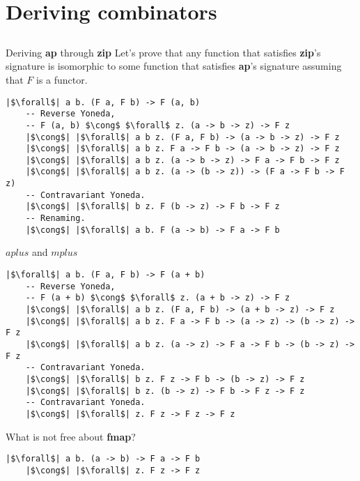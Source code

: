 \documentclass[tikz]{beamer}
\theoremstyle{definition}
\begin{document}
\section{Deriving combinators}
\subsection{}

\begin{frame}[fragile]{Deriving \textbf{ap} through \textbf{zip}}
Let's prove that any function that satisfies \textbf{zip}'s signature is isomorphic
to some function that satisfies \textbf{ap}'s signature assuming that $F$ is a functor.
\begin{verbatim}
|$\forall$| a b. (F a, F b) -> F (a, b)
    -- Reverse Yoneda,
    -- F (a, b) $\cong$ $\forall$ z. (a -> b -> z) -> F z
    |$\cong$| |$\forall$| a b z. (F a, F b) -> (a -> b -> z) -> F z
    |$\cong$| |$\forall$| a b z. F a -> F b -> (a -> b -> z) -> F z
    |$\cong$| |$\forall$| a b z. (a -> b -> z) -> F a -> F b -> F z
    |$\cong$| |$\forall$| a b z. (a -> (b -> z)) -> (F a -> F b -> F z)
    -- Contravariant Yoneda.
    |$\cong$| |$\forall$| b z. F (b -> z) -> F b -> F z
    -- Renaming.
    |$\cong$| |$\forall$| a b. F (a -> b) -> F a -> F b
\end{verbatim}
\end{frame}

\begin{frame}[fragile]{$aplus$ and $mplus$}
\begin{verbatim}
|$\forall$| a b. (F a, F b) -> F (a + b)
    -- Reverse Yoneda,
    -- F (a + b) $\cong$ $\forall$ z. (a + b -> z) -> F z
    |$\cong$| |$\forall$| a b z. (F a, F b) -> (a + b -> z) -> F z
    |$\cong$| |$\forall$| a b z. F a -> F b -> (a -> z) -> (b -> z) -> F z
    |$\cong$| |$\forall$| a b z. (a -> z) -> F a -> F b -> (b -> z) -> F z
    -- Contravariant Yoneda.
    |$\cong$| |$\forall$| b z. F z -> F b -> (b -> z) -> F z
    |$\cong$| |$\forall$| b z. (b -> z) -> F b -> F z -> F z
    -- Contravariant Yoneda.
    |$\cong$| |$\forall$| z. F z -> F z -> F z
\end{verbatim}
\end{frame}

\begin{frame}[fragile]{What is not free about \textbf{fmap}?}
\begin{verbatim}
|$\forall$| a b. (a -> b) -> F a -> F b
    |$\cong$| |$\forall$| z. F z -> F z
\end{verbatim}
\end{frame}
\end{document}
